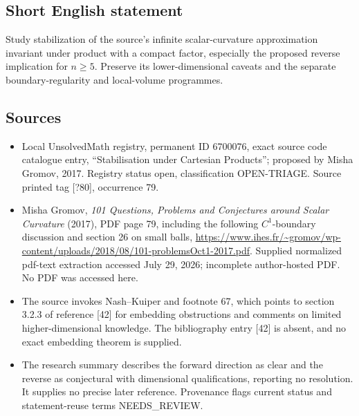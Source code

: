 \documentclass[11pt]{article}
\begin{document}
\subsection{Short English statement}
Study stabilization of the source's infinite scalar-curvature approximation invariant under product with a compact factor, especially the proposed reverse implication for $n\geq5$. Preserve its lower-dimensional caveats and the separate boundary-regularity and local-volume programmes.
\subsection{Sources}
\begin{itemize}
\item Local UnsolvedMath registry, permanent ID 6700076, exact source code catalogue entry, ``Stabilisation under Cartesian Products''; proposed by Misha Gromov, 2017. Registry status open, classification OPEN-TRIAGE. Source printed tag [?80], occurrence 79.
\item Misha Gromov, \emph{101 Questions, Problems and Conjectures around Scalar Curvature} (2017), PDF page 79, including the following $C^1$-boundary discussion and section 26 on small balls, \url{https://www.ihes.fr/~gromov/wp-content/uploads/2018/08/101-problemsOct1-2017.pdf}. Supplied normalized pdf-text extraction accessed July 29, 2026; incomplete author-hosted PDF. No PDF was accessed here.
\item The source invokes Nash--Kuiper and footnote 67, which points to section 3.2.3 of reference [42] for embedding obstructions and comments on limited higher-dimensional knowledge. The bibliography entry [42] is absent, and no exact embedding theorem is supplied.
\item The research summary describes the forward direction as clear and the reverse as conjectural with dimensional qualifications, reporting no resolution. It supplies no precise later reference. Provenance flags current status and statement-reuse terms NEEDS\_REVIEW.
\end{itemize}
\end{document}
